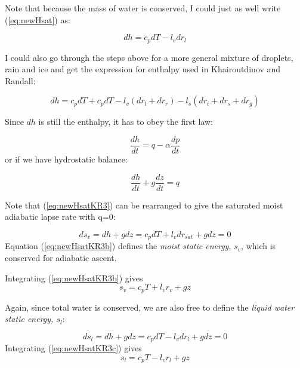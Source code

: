 \documentclass[12pt]{article}
\begin{document}
Note that because the mass of water is conserved, I could just as well write (\ref{eq:newHsat}) as:

\begin{equation}
  \label{eq:newHsatb}
  dh = c_p dT  - l_v dr_l
\end{equation}


I could also go through the steps above for a more general  mixture of droplets, rain and ice
and get the expression for enthalpy used in Khairoutdinov and Randall:


\begin{equation}
  \label{eq:newHsatKR}
  dh = c_p dT + 
        c_p dT - l_v (dr_l + dr_r) - l_s (dr_i + dr_s + dr_g)
\end{equation}

Since $dh$ is still the enthalpy, it has to obey the first law:

\begin{equation}
  \label{eq:newHsatKR2}
  \frac{dh}{dt} = q - \alpha \frac{dp}{dt} 
\end{equation}
or if we have hydrostatic balance:

\begin{equation}
  \label{eq:newHsatKR3}
  \frac{dh}{dt} + g\frac{dz}{dt}  = q
\end{equation}

Note that (\ref{eq:newHsatKR3}) can be rearranged to give the saturated moist adiabatic lapse rate
with q=0:

\begin{equation}
  \label{eq:newHsatKR3b}
ds_v =  dh + g dz   = c_p dT + l_v d r_{sat} + g dz = 0
\end{equation}
Equation (\ref{eq:newHsatKR3b}) defines the \textit{moist static energy}, $s_v$,
which is conserved for adiabatic ascent.

Integrating (\ref{eq:newHsatKR3b}) gives
\begin{equation}
  \label{eq:newHsatKR3e}
s_v = c_p T + l_v r_v + g z
\end{equation}


Again, since total water is conserved,
we are also free to define the \textit{liquid water static energy, $s_l$}:

\begin{equation}
  \label{eq:newHsatKR3c}
ds_l =  dh + g dz   = c_p dT - l_v d r_l + g dz = 0
\end{equation}
Integrating (\ref{eq:newHsatKR3c}) gives
\begin{equation}
  \label{eq:newHsatKR3d}
s_l = c_p T - l_v r_l + g z
\end{equation}
\end{document}
